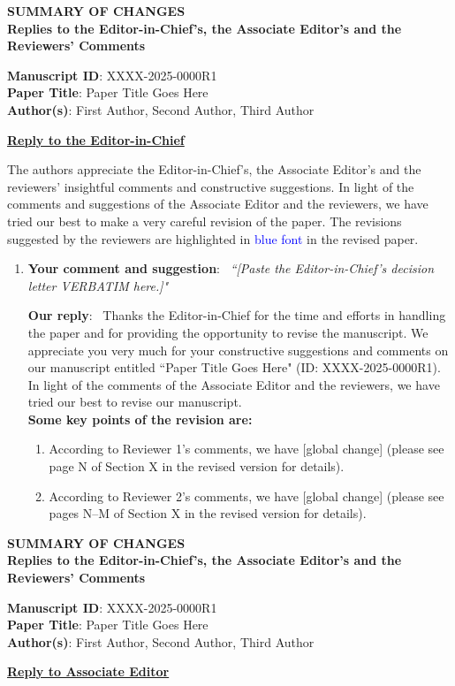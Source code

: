 \documentclass[letter,onecolumn,11pt]{IEEEtran}
\newcommand{\msid}{XXXX-2025-0000R1}                 %
\newcommand{\papertitle}{Paper Title Goes Here}      %
\newcommand{\authors}{First Author, Second Author, Third Author}  %
\newcommand{\soheader}{%
  \begin{center}
  {\LARGE \textbf{SUMMARY OF CHANGES}}\vspace{2ex}\\
  {\LARGE \textbf{Replies to the Editor-in-Chief's, the Associate
  Editor's and the Reviewers' Comments}}
  \end{center}
  \bigskip
  \noindent
  \textbf{Manuscript ID}: \msid\\
  \textbf{Paper Title}: \papertitle\\
  \textbf{Author(s)}: \authors
}
\newcommand{\recipient}[1]{\vspace{4ex} \noindent \underline{\Large \textbf{#1}}}
\begin{document}
\graphicspath{{figures/}}
\setlength{\baselineskip}{20pt}

\soheader
\recipient{Reply to the Editor-in-Chief}

\vspace{2ex} The authors appreciate the Editor-in-Chief's, the Associate Editor's and the reviewers' insightful comments and constructive suggestions. In light of the comments and suggestions of the Associate Editor and the reviewers, we have tried our best to make a very careful revision of the paper. The revisions suggested by the reviewers are highlighted in \textcolor{blue}{blue font} in the revised paper.

\begin{enumerate}[1)]
\item[0)] \textbf{Your comment and suggestion}: \ \textit{``[Paste the Editor-in-Chief's decision letter VERBATIM here.]"}
\vspace{2ex}

\textbf{Our reply}: \ Thanks the Editor-in-Chief for the time and efforts in handling the paper and for providing the opportunity to revise the manuscript. We appreciate you very much for your constructive suggestions and comments on our manuscript entitled ``\papertitle"  (ID: \msid). In light of the comments of the Associate Editor and the reviewers, we have tried our best to revise our manuscript. \\

\vspace{2ex}
\textbf{Some key points of the revision are:}
\vspace{2ex}
\begin{enumerate}[$\bullet$]
\item According to Reviewer 1's comments, we have [global change] (please see page N of Section X in the revised version for details).
\vspace{2ex}
\item According to Reviewer 2's comments, we have [global change] (please see pages N--M of Section X in the revised version for details).
\end{enumerate}
\end{enumerate}

\vfill\newpage
\soheader
\recipient{Reply to Associate Editor}
\end{document}
